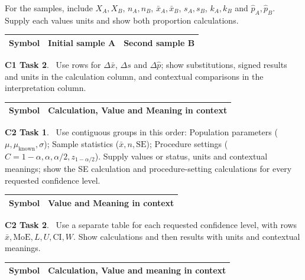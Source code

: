 \begin{multicols}{2}
For the samples, include $X_A,X_B$, $n_A,n_B$, $\bar x_A,\bar x_B$, $s_A,s_B$, $k_A,k_B$ and $\hat p_A,\hat p_B$. Supply each values units and show both proportion calculations.
\begin{center}
\begin{tabularx}{\linewidth}{@{}l | K | K@{}}
\toprule
\textbf{Symbol} & \textbf{Initial sample A} & \textbf{Second sample B}\\
\bottomrule
\end{tabularx}
\end{center}

\columnbreak 

\textbf{C1 Task 2}. \cOneB\ Use rows for $\Delta\bar x$, $\Delta s$ and $\Delta\hat p$; show substitutions, signed results and units in the calculation column, and contextual comparisons in the interpretation column.
\begin{center}
\begin{tabularx}{\linewidth}{@{}l | K@{}}
\toprule
\textbf{Symbol} &  \textbf{Calculation, Value and Meaning in context} \\
\bottomrule
\end{tabularx}
\end{center}

\textbf{C2 Task 1}. \cTwoA\ Use contiguous groups in this order: Population parameters ($\mu,\mu_{\mathrm{known}},\sigma$); Sample statistics ($\bar x,n,\mathrm{SE}$); Procedure settings ($C=1-\alpha,\alpha,\alpha/2,z_{1-\alpha/2}$). Supply values or status, units and contextual meanings; show the SE calculation and procedure-setting calculations for every requested confidence level.
\begin{center}
\begin{tabularx}{\linewidth}{@{}l | K@{}}
\toprule
\textbf{Symbol} & \textbf{Value and Meaning in context}\\
\bottomrule
\end{tabularx}
\end{center}

\textbf{C2 Task 2}. \cTwoB\ Use a separate table for each requested confidence level, with rows $\bar x,\mathrm{MoE},L,U,\mathrm{CI},W$. Show calculations and then results with units and contextual meanings.
\begin{center}
\begin{tabularx}{\linewidth}{@{}l | K@{}}
\toprule
\textbf{Symbol} & \textbf{Calculation, Value and meaning in context}\\
\bottomrule
\end{tabularx}
\end{center}


\end{multicols}
